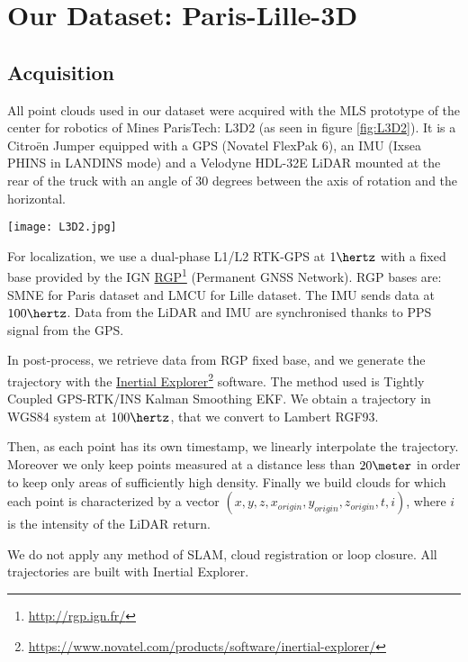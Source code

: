 \documentclass[a4paper, 10pt, journal]{article}
\begin{document}
\section{Our Dataset: Paris-Lille-3D} \label{sec:ourDataset}

\subsection{Acquisition} \label{subsec:acquisition}
All point clouds used in our dataset were acquired with the MLS prototype of the center for robotics of Mines ParisTech: L3D2 \cite{goulette2006integrated} (as seen in figure \ref{fig:L3D2}). It is a Citro\"en Jumper equipped with a GPS (Novatel FlexPak 6), an IMU (Ixsea PHINS in LANDINS mode) and a Velodyne HDL-32E LiDAR mounted at the rear of the truck with an angle of 30 degrees between the axis of rotation and the horizontal.

\begin{center}\centering
 \texttt{[image: L3D2.jpg]}
\end{center}

For localization, we use a dual-phase L1/L2 RTK-GPS at $1 \hertz$ with a fixed base provided by the IGN \href{http://rgp.ign.fr/}{RGP}\footnote{\url{http://rgp.ign.fr/}} (Permanent GNSS Network). RGP bases are: SMNE for Paris dataset and LMCU for Lille dataset. The IMU sends data at $100 \hertz$.
Data from the LiDAR and IMU are synchronised thanks to  PPS signal from the GPS.

In post-process, we retrieve data from RGP fixed base, and we generate the trajectory with the \href{https://www.novatel.com/products/software/inertial-explorer/}{Inertial Explorer}\footnote{\url{https://www.novatel.com/products/software/inertial-explorer/}} software. The method used is Tightly Coupled GPS-RTK/INS Kalman Smoothing EKF. We obtain a trajectory in WGS84 system at $100 \hertz$, that we convert to Lambert RGF93.

Then, as each point has its own timestamp, we linearly interpolate the trajectory. Moreover we only keep points measured at a distance less than $20 \meter$ in order to keep only areas of sufficiently high density. Finally we build clouds for which each point is characterized by a vector $(x,y,z,x_{origin},y_{origin},z_{origin},t,i)$, where $i$ is the intensity of the LiDAR return.

We do not apply any method of SLAM, cloud registration or loop closure. All trajectories are built with Inertial Explorer.
\end{document}
